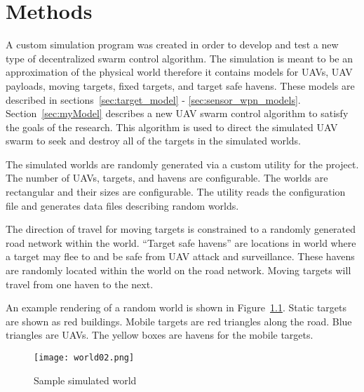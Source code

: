 \chapter{Methods}
\label{chap:worldScenModel}

A custom simulation program was created in order to develop and test a new type of decentralized swarm control algorithm. The simulation is meant to be an approximation of the physical world therefore it contains models for UAVs, UAV payloads, moving targets, fixed targets, and target safe havens.  These models are described in sections~\ref{sec:target_model} - \ref{sec:sensor_wpn_models}.  Section~\ref{sec:myModel} describes a new UAV swarm control algorithm to satisfy the goals of the research.  This algorithm is used to direct the simulated UAV swarm to seek and destroy all of the targets in the simulated worlds.

The simulated worlds are randomly generated via a custom utility for the project.  The number of UAVs, targets, and havens are configurable.  The worlds are rectangular and their sizes are configurable.  The utility reads the configuration file and generates data files describing random worlds.  


The direction of travel for moving targets is constrained to a randomly generated road network within the world.  ``Target safe havens'' are locations in world where a target may flee to and be safe from UAV attack and surveillance.  These havens are randomly located within the world on the road network.  Moving targets will travel from one haven to the next.

An example rendering of a random world is shown in Figure~\ref{fig:sample_world}. Static targets are shown as red buildings.  Mobile targets are red triangles along the road.  Blue triangles are UAVs.  The yellow boxes are havens for the mobile targets.

\begin{figure}[H]
	\centering
	\texttt{[image: world02.png]}
	\caption{Sample simulated world}
	\label{fig:sample_world}
\end{figure}

